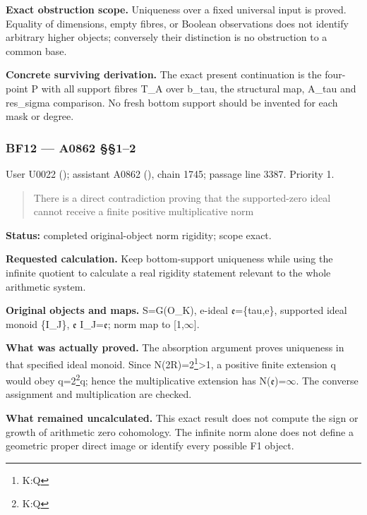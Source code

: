 \textbf{Exact obstruction scope.} Uniqueness over a fixed universal
input is proved. Equality of dimensions, empty fibres, or Boolean
observations does not identify arbitrary higher objects; conversely
their distinction is no obstruction to a common base.

\textbf{Concrete surviving derivation.} The exact present continuation
is the four-point P with all support fibres T\_A over b\_tau, the
structural map, A\_tau and res\_sigma comparison. No fresh bottom
support should be invented for each mask or degree.

\subsubsection{BF12 --- A0862 §§1--2}\label{TranscriptLedgerStage:bf12-a0862-12}

User U0022 (\protect{});
assistant A0862 (\protect{}),
chain 1745; passage line 3387. Priority 1.

\begin{quote}
There is a direct contradiction proving that the supported-zero ideal
cannot receive a finite positive multiplicative norm
\end{quote}

\textbf{Status:} completed original-object norm rigidity; scope exact.

\textbf{Requested calculation.} Keep bottom-support uniqueness while
using the infinite quotient to calculate a real rigidity statement
relevant to the whole arithmetic system.

\textbf{Original objects and maps.} S=G(O\_K), e-ideal
\allowbreak{}\ensuremath{𝔢}\allowbreak{}=\{tau,e\}, supported ideal
monoid \{I\_J\}, \allowbreak{}\ensuremath{𝔢}\allowbreak{}
I\_J=\allowbreak{}\ensuremath{𝔢}\allowbreak{}; norm map to
[1,\allowbreak{}\ensuremath{∞}\allowbreak{}].

\textbf{What was actually proved.} The absorption argument proves
uniqueness in that specified ideal monoid. Since
N(2R)=2\footnote{K:Q}\textgreater1, a positive finite extension q would
obey q=2\footnote{K:Q}q; hence the multiplicative extension has
N(\allowbreak{}\ensuremath{𝔢}\allowbreak{})=\allowbreak{}\ensuremath{∞}\allowbreak{}.
The converse assignment and multiplication are checked.

\textbf{What remained uncalculated.} This exact result does not compute
the sign or growth of arithmetic zero cohomology. The infinite norm
alone does not define a geometric proper direct image or identify every
possible F1 object.

